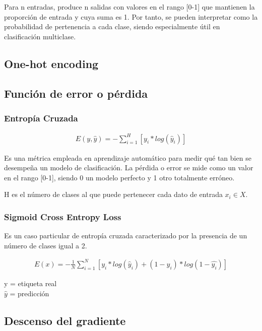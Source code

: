 Para n entradas, produce n salidas con valores en el rango [0-1] que mantienen la proporción de entrada y cuya suma es 1. Por tanto, se pueden interpretar como la probabilidad de pertenencia a cada clase, siendo especialmente útil en clasificación multiclase. \cite{SoftMax_MLM} \\
\subsection{One-hot encoding}

\subsection{Función de error o pérdida}

\subsubsection{Entropía Cruzada}

\begin{gather}
	E(y, \hat{y}) = - \sum_{i=1}^{H}  [y_i * log( \hat{y}_i)]
	\label{loss_func_softmax}
\end{gather}

Es una métrica empleada en aprendizaje automático para medir qué tan bien se desempeña un modelo de clasificación. La pérdida o error se mide como un valor en el rango [0-1], siendo 0 un modelo perfecto y 1 otro totalmente erróneo. \cite{Cross_entropy}

H es el número de clases al que puede pertenecer cada dato de entrada $x_i \in X$.



\subsubsection{Sigmoid Cross Entropy Loss}
Es un caso particular de entropía cruzada caracterizado por la presencia de un número de clases igual a 2.

\begin{gather}
	E(x) = - \frac{1}{N} \sum_{i=1}^{N}  [y_i * log( \hat{y}_i) + (1-y_i)*log(1-\hat{y_i})]
	\label{loss_func}
\end{gather}

y = etiqueta real \\
$\hat{y}$ = predicción 

\subsection{Descenso del gradiente}

